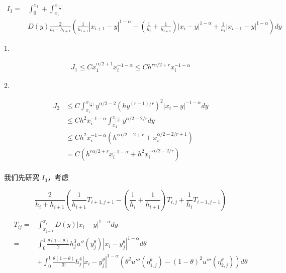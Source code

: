\documentclass{ctexart}
\theoremstyle{definition}
\theoremstyle{remark}
\numberwithin{equation}{section}
\begin{document}
\begin{equation}
    \begin{aligned}
        I_1 = & \int_0^{x_1} +\int_{x_1}^{x_{\lceil \frac{i}{2}\rceil}} \\
              & D(y) \frac{2}{h_i + h_{i+1}}
        ( \frac{1}{h_{i+1}} |x_{i+1}-y|^{1-\alpha}
        - (\frac{1}{h_{i}}+\frac{1}{h_{i+1}}) |x_{i}-y|^{1-\alpha}
        +  \frac{1}{h_{i}}|x_{i-1}-y|^{1-\alpha} )  dy
    \end{aligned}
\end{equation}


1.

\begin{equation}
    \begin{aligned}
        J_1 \le C x_1^{\alpha/2+1} x_i^{-1-\alpha} \le C h^{r\alpha/2 +r} x_i^{-1-\alpha}
    \end{aligned}
\end{equation}


2.

\begin{equation}
    \begin{aligned}
        J_2 & \le C \int_{x_1}^{x_{\lceil \frac{i}{2}\rceil}} y^{\alpha/2-2} (h y^{(r-1)/r})^2 |x_i - y|^{-1-\alpha} dy \\
            & \le C h^2 x_i^{-1-\alpha} \int_{x_1}^{x_{\lceil \frac{i}{2}\rceil}} y^{\alpha/2-2/r} dy                   \\
            & \le C h^2 x_i^{-1-\alpha} (h^{r\alpha/2-2+r} + x_i^{\alpha/2-2/r+1})                                      \\
            & = C (h^{r\alpha/2+r} x_i^{-1-\alpha} + h^2x_i^{-\alpha/2-2/r})
    \end{aligned}
\end{equation}
\\

我们先研究 \(I_3\)，考虑

\begin{equation}
    \frac{2}{h_i + h_{i+1}}
    \left( \frac{1}{h_{i+1}} T_{i+1, j+1}
    - (\frac{1}{h_{i}}+\frac{1}{h_{i+1}}) T_{i,j}
    +  \frac{1}{h_{i}} T_{i-1, j-1} \right)
\end{equation}





\begin{equation}
    \begin{aligned}
        T_{ij} = & \int_{x_{j-1}}^{x_{j}} D(y) |x_i - y|^{1-\alpha} dy                                                                                                               \\
        =        & \int_0^1 \frac{\theta (1-\theta)}{2} h_j^{3} u''(y_j^\theta) |x_i - y_j^\theta|^{1-\alpha} d\theta                                                                \\
                 & + \int_0^1 \frac{\theta (1-\theta)}{3!} h_j^{4}  |x_i - y_j^\theta|^{1-\alpha} (\theta^2 u'''(\eta_{1,j}^\theta) -  (1-\theta)^2 u'''(\eta_{2,j}^\theta)) d\theta
    \end{aligned}
\end{equation}
\end{document}
